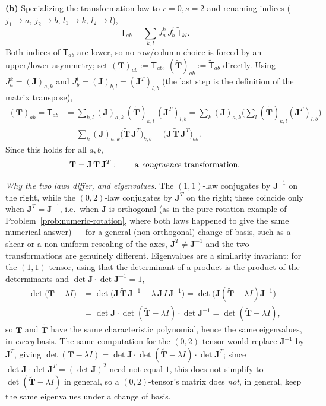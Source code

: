 \documentclass[11pt]{article}
\begin{document}
\textbf{(b)} Specializing the transformation law to $r=0,s=2$ and renaming indices ($j_1\to a,\,j_2\to b,\,l_1\to k,\,l_2\to l$),
\[
\mathsf T_{ab}=\sum_{k,l}J^k_a\,J^l_b\,\tilde{\mathsf T}_{kl}.
\]
Both indices of $\mathsf T_{ab}$ are lower, so no row/column choice is forced by an upper/lower asymmetry; set $(\mathbf T)_{ab}:=\mathsf T_{ab}$, $(\tilde{\mathbf T})_{ab}:=\tilde{\mathsf T}_{ab}$ directly. Using $J^k_a=(\mathbf J)_{a,k}$ and $J^l_b=(\mathbf J)_{b,l}=(\mathbf J^T)_{l,b}$ (the last step is the definition of the matrix transpose),
\begin{align*}
(\mathbf T)_{ab}=\mathsf T_{ab} &=\sum_{k,l}(\mathbf J)_{a,k}\,(\tilde{\mathbf T})_{k,l}\,(\mathbf J^T)_{l,b} =\sum_k(\mathbf J)_{a,k}\Big(\sum_l(\tilde{\mathbf T})_{k,l}(\mathbf J^T)_{l,b}\Big) \\
&=\sum_k(\mathbf J)_{a,k}\big(\tilde{\mathbf T}\,\mathbf J^T\big)_{k,b} =\big(\mathbf J\,\tilde{\mathbf T}\,\mathbf J^T\big)_{ab}.
\end{align*}
Since this holds for all $a,b$,
\[
\mathbf T=\mathbf J\,\tilde{\mathbf T}\,\mathbf J^T: \qquad \text{a \emph{congruence} transformation.}
\]

\emph{Why the two laws differ, and eigenvalues.} The $(1,1)$-law conjugates by $\mathbf J^{-1}$ on the right, while the $(0,2)$-law conjugates by $\mathbf J^T$ on the right; these coincide only when $\mathbf J^T=\mathbf J^{-1}$, i.e.\ when $\mathbf J$ is orthogonal (as in the pure-rotation example of Problem~\ref{prob:numeric-rotation}, where both laws happened to give the same numerical answer) --- for a general (non-orthogonal) change of basis, such as a shear or a non-uniform rescaling of the axes, $\mathbf J^T\neq\mathbf J^{-1}$ and the two transformations are genuinely different. Eigenvalues are a similarity invariant: for the $(1,1)$-tensor, using that the determinant of a product is the product of the determinants and $\det\mathbf J\cdot\det\mathbf J^{-1}=1$,
\begin{align*}
\det\big(\mathbf T-\lambda I\big) &=\det\big(\mathbf J\,\tilde{\mathbf T}\,\mathbf J^{-1}-\lambda\, \mathbf J\,I\,\mathbf J^{-1}\big) =\det\big(\mathbf J(\tilde{\mathbf T}-\lambda I)\mathbf J^{-1}\big) \\
&=\det\mathbf J\cdot\det(\tilde{\mathbf T}-\lambda I)\cdot\det\mathbf J^{-1} =\det(\tilde{\mathbf T}-\lambda I),
\end{align*}
so $\mathbf T$ and $\tilde{\mathbf T}$ have the same characteristic polynomial, hence the same eigenvalues, in \emph{every} basis. The same computation for the $(0,2)$-tensor would replace $\mathbf J^{-1}$ by $\mathbf J^T$, giving $\det(\mathbf T-\lambda I)=\det\mathbf J\cdot\det(\tilde{\mathbf T}-\lambda I)\cdot\det\mathbf J^T$; since $\det\mathbf J\cdot\det\mathbf J^T=(\det\mathbf J)^2$ need not equal $1$, this does not simplify to $\det(\tilde{\mathbf T}-\lambda I)$ in general, so a $(0,2)$-tensor's matrix does \emph{not}, in general, keep the same eigenvalues under a change of basis.
\end{document}
